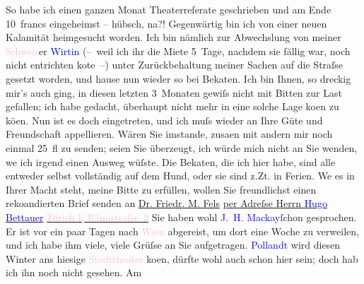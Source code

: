                     So habe ich einen ganzen Monat Theaterreferate geschrieben und am Ende 10 francs
                    eingeheimst – hübsch, na?!\pend
           \pstart
           {\pb}Gegenwärtig bin ich von einer neuen Kalamität
                    heimgesucht worden. Ich bin nämlich zur Abwechslung von meiner \textcolor{pink}{Schweiz}{}\ledrightnote{\textcolor{pink}{Schweiz}}er \textcolor{blue}{Wirtin}{} (– weil ich ihr die Miete 5 Tage, nachdem sie fällig war, noch
                    nicht entrichten ko{\geminationn}te –) unter Zurückbehaltung
                    meiner Sachen auf die Straſse gesetzt worden, und hause nun wieder so bei Beka{\geminationn}ten. Ich bin Ihnen, so dreckig mir’s auch ging,
                    in diesen letzten 3 Monaten gewiſs nicht mit Bitten zur Last gefallen; ich habe
                    gedacht, überhaupt nicht mehr in eine solche Lage ko{\geminationm}en zu kö{\geminationn}en. Nun ist es doch eingetreten, und ich
                    muſs wieder an Ihre Güte und Freundschaft appellieren. Wären Sie imstande,
                        zusa{\geminationm}en mit andern mir noch einmal 25 fl zu
                    senden; seien Sie überzeugt, ich würde mich nicht an Sie wenden, we{\geminationn} ich irgend einen Ausweg wüſste. Die Beka{\geminationn}ten, die ich hier habe, sind alle entweder selbst
                    vollständig auf dem Hund, oder sie sind z.Zt. in Ferien. We{\geminationn} es in Ihrer Macht steht, meine Bitte zu
                    erfüllen, wollen Sie freundlichst einen reko{\geminationm}andierten Brief senden an\pend
           \pstart
           \centering{}\uline{Dr. Friedr. M. Fels}\pend
           \pstart
           \noindent{}\centering{}\uline{per Adreſse Herrn \textcolor{blue}{Hugo
                            Bettauer}{}\ledrightnote{\textcolor{blue}{Hugo Bettauer}}}\pend
           \pstart
           \noindent{}\raggedleft{}\uline{\textcolor{pink}{Zürich I, Rämistraſse 2}{}\ledrightnote{\textcolor{pink}{Rämistrasse}}}\pend
           \pstart
           \noindent{}{\pb}Sie haben wohl \textcolor{blue}{J. H. Mackay}{}\ledrightnote{\textcolor{blue}{John Henry Mackay}}{ }ſchon gesprochen. Er ist vor ein paar Tagen
                    nach \textcolor{pink}{Wien}{}\ledrightnote{\textcolor{pink}{Wien}} abgereist, um dort eine Woche zu
                    verweilen, und ich habe ihm viele, viele Grüſse an Sie aufgetragen. \textcolor{blue}{Pollandt}{}\ledrightnote{\textcolor{blue}{Max Pollandt}} wird diesen Winter ans hiesige \textcolor{pink}{Stadttheater}{}\ledrightnote{\textcolor{pink}{Stadttheater}} ko{\geminationm}en, dürfte wohl auch schon hier sein; doch hab ich ihn noch nicht gesehen. Am
